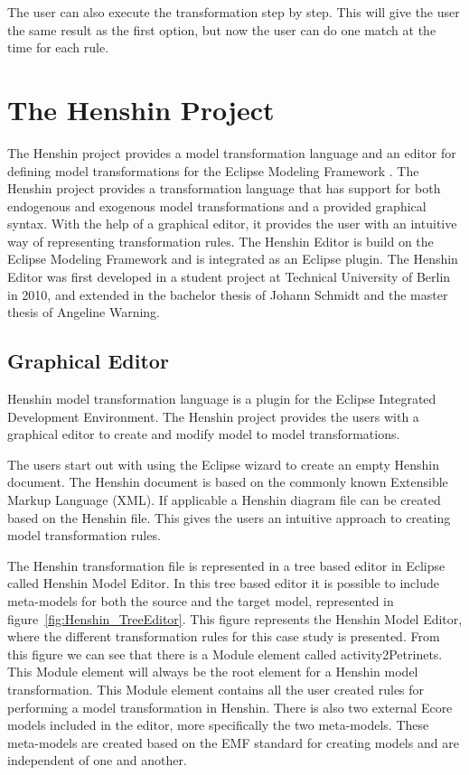 The user can also execute the transformation step by step. This will give the
user the same result as the first option, but now the user can do one match at
the time for each rule. 

\section{The Henshin Project}

The Henshin project\cite{Henshin} provides a model transformation
language and an editor for defining model transformations for the Eclipse
Modeling Framework \cite{Steinberg2009}. The Henshin project provides a
transformation language that has support for both endogenous and exogenous
model transformations and a provided graphical syntax. With the help of a
graphical editor, it provides the user with an intuitive way of representing
transformation rules. The Henshin Editor is build on the Eclipse Modeling
Framework and is integrated as an Eclipse plugin. The Henshin Editor was first
developed in a student project at Technical University of Berlin in 2010, and
extended in the bachelor thesis \cite{JohannSchmidt} of Johann Schmidt and the
master thesis \cite{AngelineWarning} of Angeline Warning.

\subsection{Graphical Editor}
Henshin model transformation language is a plugin for the Eclipse
Integrated Development Environment\cite{Eclipse}. The Henshin project provides
the users with a graphical editor to create and modify model to model
transformations. 

The users start out with using the Eclipse wizard to create an empty Henshin
document. The Henshin document is based on the commonly known Extensible Markup
Language (XML)\cite{XML}. If applicable a Henshin diagram file can be created
based on the Henshin file. This gives the users an intuitive approach to
creating model transformation rules.

The Henshin transformation file is represented in a tree based editor in
Eclipse called Henshin Model Editor. In this tree based editor it is possible
to include meta-models for both the source and the target model, represented in
figure~\ref{fig:Henshin_TreeEditor}. This figure represents the Henshin
Model Editor, where the different transformation rules for this case study is
presented. From this figure we can see that there is a Module element called
activity2Petrinets. This Module element will always be the root element for a
Henshin model transformation. This Module element contains all the user created
rules for performing a model transformation in Henshin. There is also two
external Ecore models included in the editor, more specifically the two
meta-models. These meta-models are created based on the EMF standard for creating
models and are independent of one and another.

